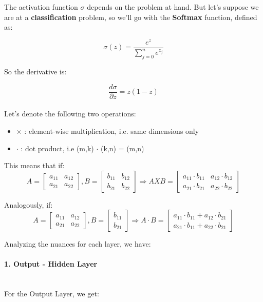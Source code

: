 \documentclass[12pt]{article}
\begin{document}
The activation function $\sigma$ depends on the problem at hand. But let's suppose we are at a \textbf{classification} problem, so we'll go with the \textbf{Softmax} function, defined as:

\begin{equation}
    \sigma (z) = \dfrac{e^{z}}{\sum_{j=0}^{n} e^{z_{j}}}
\end{equation}

So the derivative is:

\[
\dfrac{d \sigma}{\partial z} = z ( 1 - z )
\] \mbox{} \\

Let's denote the following two operations:
\begin{itemize}
    \item $\times$ : element-wise multiplication, i.e. same dimensions only
    \item $\cdot$ : dot product, i.e (m,k) $\cdot$ (k,n) = (m,n)
\end{itemize}

This means that if:
\[
A =
\begin{bmatrix}
a_{11} & a_{12}\\
a_{21} & a_{22}
\end{bmatrix}
, B = 
\begin{bmatrix}
b_{11} & b_{12}\\
b_{21} & b_{22}
\end{bmatrix}
\Rightarrow
A X B = 
\begin{bmatrix}
a_{11}\cdot b_{11} & a_{12}\cdot b_{12}\\
a_{21}\cdot b_{21} & a_{22}\cdot b_{22}
\end{bmatrix}
\] 

Analogously, if:
\[
A =
\begin{bmatrix}
a_{11} & a_{12}\\
a_{21} & a_{22}
\end{bmatrix}
, B = 
\begin{bmatrix}
b_{11}\\
b_{21}
\end{bmatrix}
\Rightarrow
A \cdot B = 
\begin{bmatrix}
a_{11}\cdot b_{11} + a_{12}\cdot b_{21}\\
a_{21}\cdot b_{11} + a_{22}\cdot b_{21}
\end{bmatrix}
\] 



Analyzing the nuances for each layer, we have:

\paragraph{1. Output - Hidden Layer} \mbox{} \\
For the Output Layer, we get:
\end{document}
